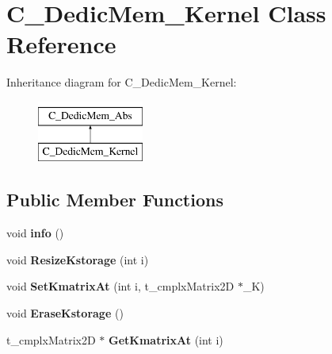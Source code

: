 \hypertarget{class_c___dedic_mem___kernel}{\section{C\-\_\-\-Dedic\-Mem\-\_\-\-Kernel Class Reference}
\label{class_c___dedic_mem___kernel}
}
Inheritance diagram for C\-\_\-\-Dedic\-Mem\-\_\-\-Kernel\-:\begin{figure}[H]
\begin{center}
\leavevmode
\includegraphics[height=2.000000cm]{class_c___dedic_mem___kernel}
\end{center}
\end{figure}
\subsection*{Public Member Functions}
\begin{DoxyCompactItemize}
\item 
\hypertarget{class_c___dedic_mem___kernel_aa51b1668792ba7e0f843b2d03deb5819}{void {\bfseries info} ()}\label{class_c___dedic_mem___kernel_aa51b1668792ba7e0f843b2d03deb5819}

\item 
\hypertarget{class_c___dedic_mem___kernel_a53112d51dde01d8b4bd8f48ccce36a91}{void {\bfseries Resize\-Kstorage} (int i)}\label{class_c___dedic_mem___kernel_a53112d51dde01d8b4bd8f48ccce36a91}

\item 
\hypertarget{class_c___dedic_mem___kernel_ac2013ecffb5dab674a568ef256f5a3f8}{void {\bfseries Set\-Kmatrix\-At} (int i, t\-\_\-cmplx\-Matrix2\-D $\ast$\-\_\-\-K)}\label{class_c___dedic_mem___kernel_ac2013ecffb5dab674a568ef256f5a3f8}

\item 
\hypertarget{class_c___dedic_mem___kernel_ae8436015627826c00ef38c038ef829f8}{void {\bfseries Erase\-Kstorage} ()}\label{class_c___dedic_mem___kernel_ae8436015627826c00ef38c038ef829f8}

\item 
\hypertarget{class_c___dedic_mem___kernel_aa95a927579efd2c095634e813c0db40f}{t\-\_\-cmplx\-Matrix2\-D $\ast$ {\bfseries Get\-Kmatrix\-At} (int i)}\label{class_c___dedic_mem___kernel_aa95a927579efd2c095634e813c0db40f}

\end{DoxyCompactItemize}
